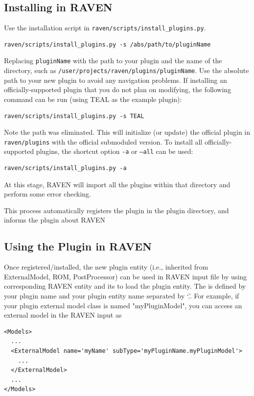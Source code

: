\subsection{Installing in RAVEN}
Use the installation script in \texttt{raven/scripts/install\_plugins.py}.
\begin{lstlisting}[morekeywords={examplePlugin, pluginInstallation}]
  raven/scripts/install_plugins.py -s /abs/path/to/pluginName
\end{lstlisting}
Replacing \texttt{pluginName} with the path to your plugin and the name of the directory, such as
\texttt{/user/projects/raven/plugins/pluginName}.
Use the absolute path to your new plugin to avoid any navigation problems.
If installing an officially-supported plugin that you do not plan on modifying, the following command
can be run (using TEAL as the example plugin):
\begin{lstlisting}[morekeywords={examplePlugin, TEALInstallation}]
  raven/scripts/install_plugins.py -s TEAL
\end{lstlisting}
Note the path was eliminated. This will initialize (or update) the official plugin in
\texttt{raven/plugins} with the official submoduled version.
To install all officially-supported plugins, the shortcut option \texttt{-a} or \texttt{--all} can be used:
\begin{lstlisting}[morekeywords={examplePlugin, installAllPlugin}]
  raven/scripts/install_plugins.py -a
\end{lstlisting}
At this stage, RAVEN will import all the plugins within that directory and perform some error checking.

This process automatically registers the plugin in the plugin directory, and informs the plugin
about RAVEN %

\subsection{Using the Plugin in RAVEN}
Once registered/installed, the new plugin entity (i.e., inherited from ExternalModel, ROM, PostProcessor) can be used in RAVEN input file by
using corresponding RAVEN entity and its  to load the plugin entity. The  is defined by your plugin name and your
plugin entity name separated by `.'.
For example, if your plugin external model class is named "myPluginModel",
you can access an external model in the RAVEN input as

\begin{lstlisting}[style=XML, morekeywords={usingPlugin}]
<Models>
  ...
  <ExternalModel name='myName' subType='myPluginName.myPluginModel'>
    ...
  </ExternalModel>
  ...
</Models>
\end{lstlisting}

